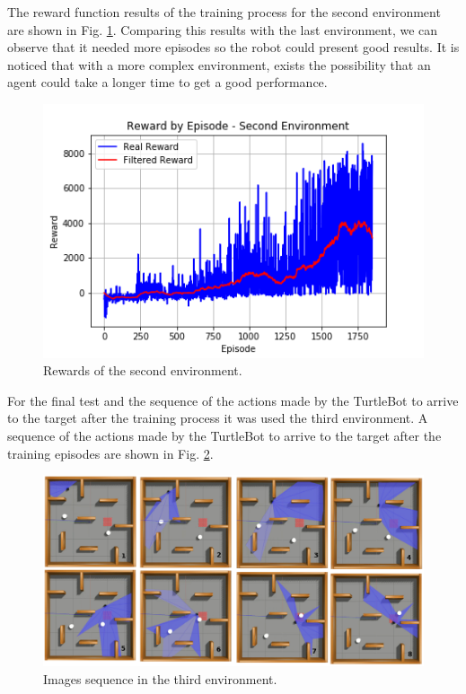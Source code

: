 The reward function results of the training process for the second environment are shown in Fig. \ref{fig:stage_2}.
Comparing this results with the last environment, we can observe that it needed more episodes so the robot could present good results.
It is noticed that with a more complex environment, exists the possibility that an agent could take a longer time to get a good performance.

\begin{figure}
\centerline{\includegraphics[width=\columnwidth]{images/stage_2.png}}
\caption{Rewards of the second environment.}
\label{fig:stage_2}
\end{figure}

For the final test and the sequence of the actions made by the TurtleBot to arrive to the target after the training process it was used the third environment.  A sequence of the actions made by the TurtleBot to arrive to the target after the training episodes are shown in Fig. \ref{fig:amb3target}.

\begin{figure}
\centerline{\includegraphics[width=\columnwidth]{images/amb3target.png}}
\caption{Images sequence in the third environment.}
\label{fig:amb3target}
\end{figure}

